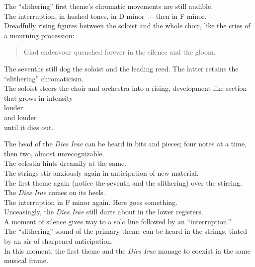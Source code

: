 \documentclass{beamer}
\begin{document}
\begin{frame}
  The ``slithering'' first theme's chromatic movements are still audible. 
  \pause \\ 
  The interruption, in hushed tones, in D minor --- \pause then in F minor. 
  \pause \\ 
  Dreadfully rising figures between the soloist and the whole choir, like the cries of a mourning procession: 
  \pause \\
  \begin{quote} %
    G{\pause}l{\pause}a{\pause}d{\pause} e{\pause}n{\pause}d{\pause}e{\pause}a{\pause}v{\pause}o{\pause}u{\pause}r{\pause} q{\pause}u{\pause}e{\pause}n{\pause}c{\pause}h{\pause}e{\pause}d{\pause} f{\pause}o{\pause}r{\pause}e{\pause}v{\pause}e{\pause}r{\pause} i{\pause}n{\pause} t{\pause}h{\pause}e{\pause} s{\pause}i{\pause}l{\pause}e{\pause}n{\pause}c{\pause}e{\pause} a{\pause}n{\pause}d{\pause} t{\pause}h{\pause}e{\pause} g{\pause}l{\pause}o{\pause}o{\pause}m{\pause}. 
  \end{quote} 
\end{frame} 

\begin{frame}
  The sevenths still dog the soloist and the leading reed. The latter retains the ``slithering'' chromaticism. 
  \pause \\ 
  The soloist steers the choir and orchestra into a rising, development-like section that grows in intensity --- 
  \pause \\ 
  louder 
  \pause \\ 
  and louder 
  \pause \\ 
  \textellipsis until it dies out. 
\end{frame} 

\begin{frame}
  The head of the \textit{Dies Irae} can be heard in bits and pieces; \pause four notes at a time, \pause then two, almost unrecognizable. 
  \pause \\ 
  The celestia hints dreamily at the same. 
  \pause \\ 
  The strings stir anxiously again in anticipation of new material. 
  \pause \\ 
  The first theme again (notice the seventh and the slithering) over the stirring. \pause The \textit{Dies Irae} comes on its heels. 
  \pause \\ 
  The interruption in F minor again. Here goes something. 
  \pause \\ 
  Unceasingly, the \textit{Dies Irae} still darts about in the lower registers. 
  \pause \\ 
  A moment of silence gives way to a solo line followed by an ``interruption.'' 
  \pause \\ 
  The ``slithering'' sound of the primary theme can be heard in the strings, tinted by an air of sharpened anticipation.
  \pause \\ 
  In this moment, the first theme and the \textit{Dies Irae} manage to coexist in the same musical frame. 
\end{frame} 
\end{document}
